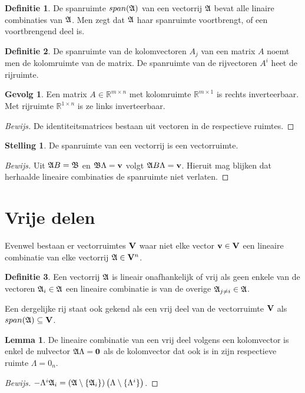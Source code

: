 \documentclass{amsart}
\theoremstyle{definition}
\newtheorem{thm}{Stelling}[section]
\newtheorem{lmm}{Lemma}[section]
\newtheorem{dfn}{Definitie}[section]
\newtheorem{csq}{Gevolg}[section]
\newenvironment{bewijs}{\begin{proof}[Bewijs]}{\end{proof}}
\newcommand{\setsm}[1]{\{{#1}\}}
\newcommand{\without}[1]{\setminus\setsm{#1}}
\newcommand{\realnums}{\mathbb{R}}
\newcommand{\realn}[1][n]{\realnums^{#1}}
\newcommand{\realmx}[2][n]{\realn[#2 \times #1]}
\newcommand{\realmxn}{\realmx{m}}
\newcommand{\vecspace}[1][v]{\mathrm{\mathbf{\MakeUppercase#1}}}
\newcommand{\vecspacen}[1][n]{\vecspace^#1}
\newcommand{\vvec}[1][v]{\mathbf{#1}}
\newcommand{\zerovec}{\vvec[0]}
\newcommand{\vecrow}[1][a]{\mathfrak{\MakeUppercase{#1}}}
\newcommand{\rvec}[2][i]{{#2}_{#1}}
\newcommand{\rvecr}[2][i]{\rvec[#1]{\vecrow[#2]}}
\newcommand{\rveci}[1][i]{\rvecr[#1]{a}}
\begin{document}
\begin{dfn}
    De spanruimte $span(\vecrow)$ van een vectorrij $\vecrow$ bevat alle linaire combinaties van $\vecrow$.
    Men zegt dat $\vecrow$ haar spanruimte voortbrengt, of een voortbrengend deel is.
\end{dfn}

\begin{dfn}
    De spanruimte van de kolomvectoren $A_j$ van een matrix $A$ noemt men de kolomruimte van de matrix.
    De spanruimte van de rijvectoren $A^i$ heet de rijruimte.
\end{dfn}

\begin{csq}
    Een matrix $A \in \realmxn$ met kolomruimte $\realn[m \times 1]$ is rechts inverteerbaar.
    Met rijruimte $\realn[1 \times n]$ is ze links inverteerbaar.
    \begin{bewijs}
        De identiteitsmatrices bestaan uit vectoren in de respectieve ruimtes.
    \end{bewijs}
\end{csq}

\begin{thm}
    De spanruimte van een vectorrij is een vectorruimte.
    \begin{bewijs}
        Uit $\vecrow B = \vecrow[b]$ en $\vecrow[b] \Lambda= \vvec$ volgt $\vecrow B \Lambda = \vvec$.
        Hieruit mag blijken dat herhaalde lineaire combinaties de spanruimte niet verlaten.
    \end{bewijs}
\end{thm}

\section{Vrije delen}

Evenwel bestaan er vectorruimtes $\vecspace$ waar niet elke vector $\vvec \in \vecspace$ een lineaire combinatie van elke vectorrij $\vecrow \in \vecspacen$.

\begin{dfn}
    Een vectorrij $\vecrow$ is lineair onafhankelijk of vrij als geen enkele van de vectoren $\vecrow_i \in \vecrow$ een lineaire combinatie is van de overige $\vecrow_{j\neq i} \in \vecrow$.

    Een dergelijke rij staat ook gekend als een vrij deel van de vectorruimte $\vecspace$ als $span(\vecrow) \subseteq \vecspace$.
\end{dfn}

\begin{lmm}
    De lineaire combinatie van een vrij deel volgens een kolomvector is enkel de nulvector $\vecrow \Lambda = \zerovec$ als de kolomvector dat ook is in zijn respectieve ruimte $\Lambda = 0_n$.
    \begin{bewijs}
        $-\Lambda^i \vecrow_i = \left(\vecrow \without{\rveci}\right)\left(\Lambda \without{\Lambda^i}\right)$.
    \end{bewijs}
\end{lmm}
\end{document}
